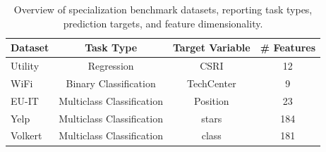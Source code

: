 


\setlength{\tabcolsep}{7pt}
\begin{table}[t]
\centering
\footnotesize
\caption{Overview of specialization benchmark datasets, reporting task types, prediction targets, and feature dimensionality.}
\vspace{-3mm}
\label{tab:datasets}
\begin{tabular}{lccc}
\hline
\textbf{Dataset} & \textbf{Task Type} & \textbf{Target Variable} & \textbf{\# Features} \\
\hline
Utility   & Regression                & CSRI        & 12  \\
WiFi      & Binary Classification      & TechCenter  & 9   \\
EU-IT     & Multiclass Classification  & Position    & 23  \\
Yelp      & Multiclass Classification  & stars       & 184   \\
Volkert   & Multiclass Classification  & class       & 181   \\
\hline
\end{tabular}
\end{table}